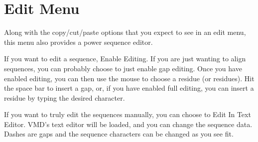 \section{Edit Menu}

Along with the copy/cut/paste options that you expect to see in an edit
menu, this menu also provides a power sequence editor.

If you want to edit a sequence, \textsf{Enable Editing}.  If you are
just wanting to align sequences, you can probably choose to just enable
gap editing.  Once you have enabled editing, you can then use the mouse
to choose a residue (or residues).  Hit the space bar to insert a gap,
or, if you have enabled full editing, you can insert a residue by typing
the desired character.

If you want to truly edit the sequences manually, you can choose to
\textsf{Edit In Text Editor}.  VMD's text editor will be loaded, and you
can change the sequence data.  Dashes are gaps and the sequence
characters can be changed as you see fit.

